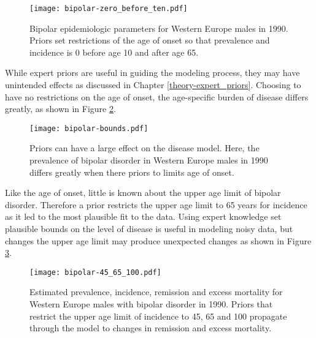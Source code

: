     \begin{figure}[h]
        \begin{center}
            \texttt{[image: bipolar-zero\_before\_ten.pdf]}
            \caption{Bipolar epidemiologic parameters for Western Europe males in 1990.  Priors set restrictions of the age of onset so that prevalence and incidence is 0 before age 10 and after age 65.}
            \label{fig:app-bipolar fit}
        \end{center}
    \end{figure}

While expert priors are useful in guiding the modeling process, they may have unintended effects as discussed in Chapter \ref{theory-expert_priors}.  Choosing to have no restrictions on the age of onset, the age-specific burden of disease differs greatly, as shown in Figure \ref{fig:app-bipolar bounds}.

    \begin{figure}[h]
        \begin{center}
            \texttt{[image: bipolar-bounds.pdf]}
            \caption{Priors can have a large effect on the disease model.  Here, the prevalence of bipolar disorder in Western Europe males in 1990 differs greatly when there priors to limits age of onset.}
            \label{fig:app-bipolar bounds}
        \end{center}
    \end{figure}

Like the age of onset, little is known about the upper age limit of bipolar disorder.  Therefore a prior restricts the upper age limit to 65 years for incidence as it led to the most plausible fit to the data.  Using expert knowledge set plausible bounds on the level of disease is useful in modeling noisy data, but changes the upper age limit may produce unexpected changes as shown in Figure \ref{fig:app-bipolar onset}.

    \begin{figure}[h]
        \begin{center}
            \texttt{[image: bipolar-45\_65\_100.pdf]}
            \caption{Estimated prevalence, incidence, remission and excess mortality for Western Europe males with bipolar disorder in 1990.  Priors that restrict the upper age limit of incidence to 45, 65 and 100 propagate through the model to changes in remission and excess mortality.}
            \label{fig:app-bipolar onset}
        \end{center}
    \end{figure}

